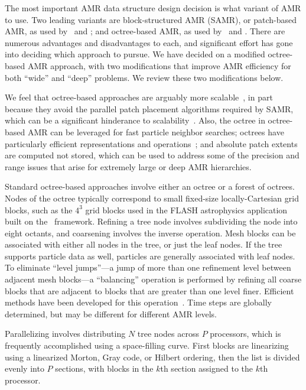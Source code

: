 \documentclass[10pt,twocolumn]{article}
\begin{document}
The most important AMR data structure design decision is what variant
of AMR to use.  Two leading variants are block-structured AMR (SAMR),
or patch-based AMR, as used by \samrai\ and \chombo; and octree-based
AMR, as used by \paramesh\ and \alps.  There are numerous advantages
and disadvantages to each, and significant effort has gone into
deciding which approach to pursue.  We have decided on a modified
octree-based AMR approach, with two modifications that improve AMR
efficiency for both ``wide'' and ``deep'' problems.  We review these
two modifications below.

We feel that octree-based approaches are arguably more
scalable~\cite{BuGh08}, in part because they avoid the parallel patch
placement algorithms required by SAMR, which can be a significant
hinderance to scalability~\cite{GuWi06}.  
Also, the octree in octree-based AMR can be leveraged for fast
particle neighbor searches; octrees have particularly efficient
representations and operations~\cite{FrPe02}; and absolute patch
extents are computed not stored, which can be used to address some of
the precision and range issues that arise for extremely large or deep
AMR hierarchies.

Standard octree-based approaches involve either an octree or a forest
of octrees.  Nodes of the octree typically correspond to small
fixed-size locally-Cartesian grid blocks, such as the $4^3$ grid
blocks used in the FLASH astrophysics application built on the
\paramesh\ framework.  Refining a tree node involves subdividing the
node into eight octants, and coarsening involves the inverse
operation.  Mesh blocks can be associated with either all nodes in the
tree, or just the leaf nodes.  If the tree supports particle data as
well, particles are generally associated with leaf nodes.  To
eliminate ``level jumps''---a jump of more than one refinement level
between adjacent mesh blocks---a ``balancing'' operation is performed
by refining all coarse blocks that are adjacent to blocks that are
greater than one level finer.  Efficient methods have been developed
for this operation~\cite{@@@fast-balance}.  Time steps are globally
determined, but may be different for different AMR levels.

Parallelizing involves distributing $N$ tree nodes across $P$
processors, which is frequently accomplished using a space-filling
curve.  First blocks are linearizing using a linearized Morton, Gray
code, or Hilbert ordering, then the list is divided evenly into $P$
sections, with blocks in the $k$th section assigned to the $k$th
processor.
\end{document}
